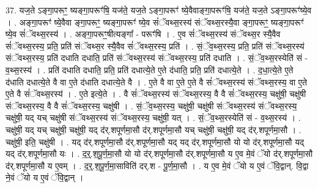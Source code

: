 \documentclass[17pt]{extarticle}
\begin{document}
37. यज॒ते ऽङ्गा॒परूꣳ॒॒ ष्यङ्गा॒परूꣳ॑षि॒ यज॑ते॒ यज॒ते ऽङ्गा॒परूꣳ॑ ष्ये॒वैवाङ्गा॒परूꣳ॑षि॒ यज॑ते॒ यज॒ते ऽङ्गा॒परूꣳ॑ष्ये॒व । . अङ्गा॒परूꣳ॑ ष्ये॒वैवा ङ्गा॒परूꣳ॒॒ ष्यङ्गा॒परूꣳ॑ ष्ये॒व सं॑ॅवथ्स॒रस्य॑ संॅवथ्स॒रस्यै॒वा ङ्गा॒परूꣳ॒॒ ष्यङ्गा॒परूꣳ॑ ष्ये॒व सं॑ॅवथ्स॒रस्य॑ । . अङ्गा॒परूꣳ॒॒षीत्यङ्गा᳚ - परूꣳ॑षि । . ए॒व सं॑ॅवथ्स॒रस्य॑ संॅवथ्स॒र स्यै॒वैव सं॑ॅवथ्स॒रस्य॒ प्रति॒ प्रति॑ संॅवथ्स॒र स्यै॒वैव सं॑ॅवथ्स॒रस्य॒ प्रति॑ । . सं॒ॅव॒थ्स॒रस्य॒ प्रति॒ प्रति॑ संॅवथ्स॒रस्य॑ संॅवथ्स॒रस्य॒ प्रति॑ दधाति दधाति॒ प्रति॑ संॅवथ्स॒रस्य॑ संॅवथ्स॒रस्य॒ प्रति॑ दधाति । . सं॒ॅव॒थ्स॒रस्येति॑ सं - व॒थ्स॒रस्य॑ । . प्रति॑ दधाति दधाति॒ प्रति॒ प्रति॑ दधात्ये॒ते ए॒ते द॑धाति॒ प्रति॒ प्रति॑ दधात्ये॒ते । . द॒धा॒त्ये॒ते ए॒ते द॑धाति दधात्ये॒ते वै वा ए॒ते द॑धाति दधात्ये॒ते वै । . ए॒ते वै वा ए॒ते ए॒ते वै सं॑ॅवथ्स॒रस्य॑ संॅवथ्स॒रस्य॒ वा ए॒ते ए॒ते वै सं॑ॅवथ्स॒रस्य॑ । . ए॒ते इत्ये॒ते । . वै सं॑ॅवथ्स॒रस्य॑ संॅवथ्स॒रस्य॒ वै वै सं॑ॅवथ्स॒रस्य॒ चक्षु॑षी॒ चक्षु॑षी संॅवथ्स॒रस्य॒ वै वै सं॑ॅवथ्स॒रस्य॒ चक्षु॑षी । . सं॒ॅव॒थ्स॒रस्य॒ चक्षु॑षी॒ चक्षु॑षी संॅवथ्स॒रस्य॑ संॅवथ्स॒रस्य॒ चक्षु॑षी॒ यद् यच् चक्षु॑षी संॅवथ्स॒रस्य॑ संॅवथ्स॒रस्य॒ चक्षु॑षी॒ यत् । . सं॒ॅव॒थ्स॒रस्येति॑ सं - व॒थ्स॒रस्य॑ । . चक्षु॑षी॒ यद् यच् चक्षु॑षी॒ चक्षु॑षी॒ यद् द॑र्.शपूर्णमा॒सौ द॑र्.शपूर्णमा॒सौ यच् चक्षु॑षी॒ चक्षु॑षी॒ यद् द॑र्.शपूर्णमा॒सौ । . चक्षु॑षी॒ इति॒ चक्षु॑षी । . यद् द॑र्.शपूर्णमा॒सौ द॑र्.शपूर्णमा॒सौ यद् यद् द॑र्.शपूर्णमा॒सौ यो यो द॑र्.शपूर्णमा॒सौ यद् यद् द॑र्.शपूर्णमा॒सौ यः । . द॒र्॒.श॒पू॒र्ण॒मा॒सौ यो यो द॑र्.शपूर्णमा॒सौ द॑र्.शपूर्णमा॒सौ य ए॒व मे॒वं ॅयो द॑र्.शपूर्णमा॒सौ द॑र्.शपूर्णमा॒सौ य ए॒वम् । . द॒र्॒.श॒पू॒र्ण॒मा॒साविति॑ दर्.श - पू॒र्ण॒मा॒सौ । . य ए॒व मे॒वं ॅयो य ए॒वं ॅवि॒द्वान्. वि॒द्वा ने॒वं ॅयो य ए॒वं ॅवि॒द्वान् । \newline
\end{document}
